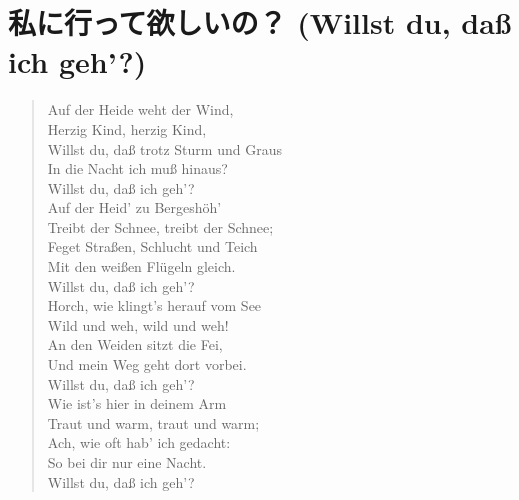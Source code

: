 
\section{私に行って欲しいの？ (Willst du, daß ich geh'?)}

\begin{quote}
	Auf der Heide weht der Wind, \\
	Herzig Kind, herzig Kind, \\
	Willst du, daß trotz Sturm und Graus \\
	In die Nacht ich muß hinaus? \\
	Willst du, daß ich geh'? \\

	Auf der Heid' zu Bergeshöh' \\
	Treibt der Schnee, treibt der Schnee; \\
	Feget Straßen, Schlucht und Teich \\
	Mit den weißen Flügeln gleich. \\
	Willst du, daß ich geh'? \\

	Horch, wie klingt’s herauf vom See \\
	Wild und weh, wild und weh! \\
	An den Weiden sitzt die Fei, \\
	Und mein Weg geht dort vorbei. \\
	Willst du, daß ich geh'? \\

	Wie ist's hier in deinem Arm \\
	Traut und warm, traut und warm; \\
	Ach, wie oft hab' ich gedacht: \\
	So bei dir nur eine Nacht. \\
	Willst du, daß ich geh'?
\end{quote}

